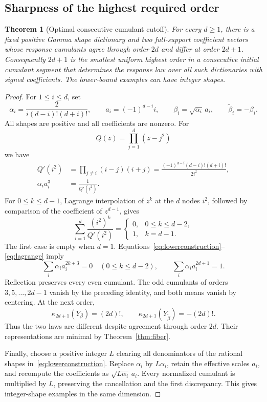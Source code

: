 \documentclass[11pt]{article}
\newtheorem{theorem}{Theorem}[section]
\theoremstyle{definition}\newtheorem{definition}[theorem]{Definition}
\theoremstyle{remark}\newtheorem{remark}[theorem]{Remark}
\begin{document}
\subsection{Sharpness of the highest required order}
\begin{theorem}[Optimal consecutive cumulant cutoff]\label{thm:optimal}
For every $d\ge1$, there is a fixed positive Gamma shape dictionary and two full-support coefficient vectors whose response cumulants agree through order $2d$ and differ at order $2d+1$. Consequently $2d+1$ is the smallest uniform highest order in a consecutive initial cumulant segment that determines the response law over all such dictionaries with signed coefficients. The lower-bound examples can have integer shapes.
\end{theorem}
\begin{proof}
For $1\le i\le d$, set
\begin{equation}\label{eq:lowerconstruction}
 \alpha_i=\frac{2}{i(d-i)!(d+i)!},\qquad
 a_i=(-1)^{d-i}i,\qquad
 \beta_i=\sqrt{\alpha_i}\,a_i,\qquad
 \widetilde\beta_i=-\beta_i.
\end{equation}
All shapes are positive and all coefficients are nonzero. For
\[
 Q(z)=\prod_{j=1}^d(z-j^2)
\]
we have
\begin{align*}
 Q'(i^2)&=\prod_{j\ne i}(i-j)(i+j)
       =\frac{(-1)^{d-i}(d-i)!(d+i)!}{2i^2},\\
 \alpha_i a_i^3&=\frac{1}{Q'(i^2)}.
\end{align*}
For $0\le k\le d-1$, Lagrange interpolation of $z^k$ at the $d$ nodes $i^2$, followed by comparison of the coefficient of $z^{d-1}$, gives
\begin{equation}\label{eq:lagrange}
 \sum_{i=1}^d\frac{(i^2)^k}{Q'(i^2)}=
 \begin{cases}0,&0\le k\le d-2,\\1,&k=d-1.\end{cases}
\end{equation}
The first case is empty when $d=1$. Equations~\eqref{eq:lowerconstruction}--\eqref{eq:lagrange} imply
\[
 \sum_i\alpha_i a_i^{2k+3}=0\quad(0\le k\le d-2),\qquad
 \sum_i\alpha_i a_i^{2d+1}=1.
\]
Reflection preserves every even cumulant. The odd cumulants of orders $3,5,\ldots,2d-1$ vanish by the preceding identity, and both means vanish by centering. At the next order,
\[
 \kappa_{2d+1}(Y_\beta)=(2d)!,\qquad
 \kappa_{2d+1}(Y_{\widetilde\beta})=-(2d)!.
\]
Thus the two laws are different despite agreement through order $2d$. Their representations are minimal by Theorem~\ref{thm:fiber}.

Finally, choose a positive integer $L$ clearing all denominators of the rational shapes in~\eqref{eq:lowerconstruction}. Replace $\alpha_i$ by $L\alpha_i$, retain the effective scales $a_i$, and recompute the coefficients as $\sqrt{L\alpha_i}\,a_i$. Every normalized cumulant is multiplied by $L$, preserving the cancellation and the first discrepancy. This gives integer-shape examples in the same dimension.
\end{proof}
\end{document}
